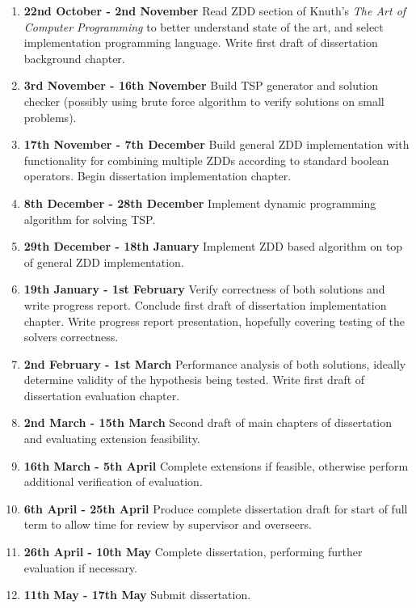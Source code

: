 \documentclass[12pt,a4paper,twoside]{article}
\begin{document}
\begin{enumerate}

\item \textbf{22nd October - 2nd November} Read ZDD section of Knuth's \textit{The Art of Computer Programming} to better understand state of the art, and select implementation programming language. Write first draft of dissertation background chapter.

\item \textbf{3rd November - 16th November} Build TSP generator and solution checker (possibly using brute force algorithm to verify solutions on small problems).

\item \textbf{17th November - 7th December} Build general ZDD implementation with functionality for combining multiple ZDDs according to standard boolean operators. Begin dissertation implementation chapter.

\item \textbf{8th December - 28th December} Implement dynamic programming algorithm for solving TSP.

\item \textbf{29th December - 18th January} Implement ZDD based algorithm on top of general ZDD implementation.

\item \textbf{19th January - 1st February} Verify correctness of both solutions and write progress report. Conclude first draft of dissertation implementation chapter. Write progress report presentation, hopefully covering testing of the solvers correctness.

\item \textbf{2nd February - 1st March} Performance analysis of both solutions, ideally determine validity of the hypothesis being tested. Write first draft of dissertation evaluation chapter.

\item \textbf{2nd March - 15th March} Second draft of main chapters of dissertation and evaluating extension feasibility.

\item \textbf{16th March - 5th April} Complete extensions if feasible, otherwise perform additional verification of evaluation.

\item \textbf{6th April - 25th April} Produce complete dissertation draft for start of full term to allow time for review by supervisor and overseers.

\item \textbf{26th April - 10th May}  Complete dissertation, performing further evaluation if necessary.

\item \textbf{11th May - 17th May} Submit dissertation.

\end{enumerate}
\end{document}

